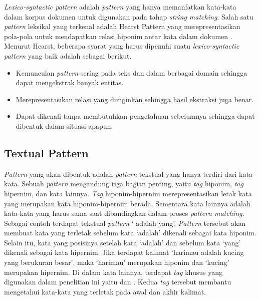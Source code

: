 \textit{Lexico-syntactic pattern} adalah \textit{pattern} yang hanya memanfatkan kata-kata dalam korpus dokumen untuk digunakan pada tahap \textit{string matching}. Salah satu \textit{pattern} leksikal yang terkenal adalah Hearst Pattern yang merepresentasikan pola-pola untuk mendapatkan relasi hiponim antar kata dalam dokumen \citep{hearst1992automatic}. Menurut Hearst, beberapa syarat yang harus dipenuhi suatu \textit{lexico-syntactic pattern} yang baik adalah sebagai berikut.
\begin{itemize}
  \item Kemunculan \textit{pattern} sering pada teks dan dalam berbagai domain sehingga dapat mengekstrak banyak entitas.
  \item Merepresentasikan relasi yang diinginkan sehingga hasil ekstraksi juga benar.
  \item Dapat dikenali tanpa membutuhkan pengetahuan sebelumnya sehingga dapat dibentuk dalam situasi apapun.
\end{itemize}

\subsection{Textual Pattern}
\textit{Pattern} yang akan dibentuk adalah \textit{pattern} tekstual yang hanya terdiri dari kata-kata. Sebuah \textit{pattern} mengandung tiga bagian penting, yaitu \textit{tag} hiponim, \textit{tag} hipernim, dan kata lainnya. \textit{Tag} hiponim-hipernim merepresentasikan letak kata yang merupakan kata hiponim-hipernim berada. Sementara kata lainnya adalah kata-kata yang harus sama saat dibandingkan dalam proses \textit{pattern matching}. Sebagai contoh terdapat tekstual \textit{pattern} `{\tagHyponym} adalah {\tagHypernym} yang'. \textit{Pattern} tersebut akan membuat kata yang terletak sebelum kata `adalah' dikenali sebagai kata hiponim. Selain itu, kata yang posisinya setelah kata `adalah' dan sebelum kata `yang' dikenali sebagai kata hipernim. Jika terdapat kalimat `harimau adalah kucing yang berukuran besar', maka `harimau' merupakan hiponim dan `kucing' merupakan hipernim. Di dalam kata lainnya, terdapat \textit{tag} khusus yang digunakan dalam penelitian ini yaitu {\tagStart} dan {\tagEnd}. Kedua \textit{tag} tersebut membantu mengetahui kata-kata yang terletak pada awal dan akhir kalimat.

